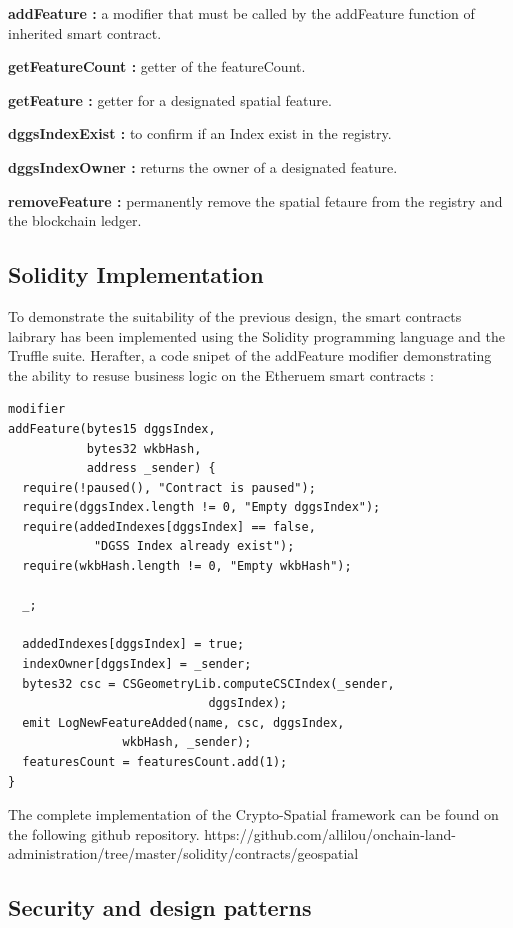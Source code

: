\documentclass{isprs} %
\begin{document}
\textbf{addFeature :} a modifier that must be called by the addFeature function of inherited smart contract.

\textbf{getFeatureCount :} getter of the featureCount.

\textbf{getFeature :} getter for a designated spatial feature.

\textbf{dggsIndexExist :} to confirm if an Index exist in the registry.

\textbf{dggsIndexOwner :} returns the owner of a designated feature.

\textbf{removeFeature :} permanently remove the spatial fetaure from the registry and the blockchain ledger.

\subsection{Solidity Implementation}\label{sec:Solidity Implementation}

To demonstrate the suitability of the previous design, the smart contracts laibrary has been implemented using the Solidity programming language and the Truffle suite. Herafter, a code snipet of the addFeature modifier demonstrating the ability to resuse business logic on the Etheruem smart contracts :

\begin{verbatim}
modifier 
addFeature(bytes15 dggsIndex, 
		   bytes32 wkbHash, 
		   address _sender) {
  require(!paused(), "Contract is paused");
  require(dggsIndex.length != 0, "Empty dggsIndex");
  require(addedIndexes[dggsIndex] == false, 
  			"DGSS Index already exist");
  require(wkbHash.length != 0, "Empty wkbHash");

  _;

  addedIndexes[dggsIndex] = true;
  indexOwner[dggsIndex] = _sender;
  bytes32 csc = CSGeometryLib.computeCSCIndex(_sender, 
  							dggsIndex); 
  emit LogNewFeatureAdded(name, csc, dggsIndex, 
  				wkbHash, _sender);
  featuresCount = featuresCount.add(1);
}
\end{verbatim}

The complete implementation of the Crypto-Spatial framework can be found on the following github repository.
https://github.com/allilou/onchain-land-administration/tree/master/solidity/contracts/geospatial

\subsection{Security and design patterns}\label{sec:Security issues and design patterns}
\end{document}
